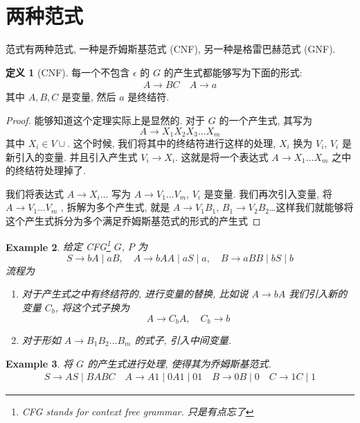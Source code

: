 \documentclass[12pt]{ctexart}
\theoremstyle{definition}
\newtheorem{definition}{定义}[section]
\theoremstyle{plain}
\newtheorem{exam}[definition]{Example}
\theoremstyle{remark}
\begin{document}
\section{两种范式}
\label{sec:两种范式}
范式有两种范式, 一种是乔姆斯基范式 (CNF), 另一种是格雷巴赫范式 (GNF). 

\begin{definition}[CNF]
\label{def:CNF}
每一个不包含 \(\epsilon\) 的 \(G\) 的产生式都能够写为下面的形式: 
\[
	\begin{aligned}
	A  \to BC  \quad A \to a 
	\end{aligned}
\]
其中 \(A,  B , C \) 是变量, 然后 \(a\) 是终结符. 
\end{definition}

\begin{proof}
能够知道这个定理实际上是显然的. 对于 \(G\) 的一个产生式, 其写为 
\[
A \to X_1 X_2 X_3 \dots X_m 
\]
	其中 \(X _{i} \in V \cup\). 这个时候, 我们将其中的终结符进行这样的处理, \(X_{i}\) 换为 \(V_{i}\), \(V_{i}\) 是新引入的变量. 
	并且引入产生式 \(V_{i} \to X _{i}\). 这就是将一个表达式 \(A \to X_1 \dots X_{m}\) 之中的终结符处理掉了. 
	
	我们将表达式 \(A \to X _{i}\dots\) 写为 \(A \to V_1 \dots V_{m}\), \(V_{i}\) 是变量. 我们再次引入变量, 将 \(A \to V_1\dots V_{m}\) , 拆解为多个产生式, 就是 \(A \to V_1 B_1\), \(B_1 \to V_2 B_2\)\dots 这样我们就能够将这个产生式拆分为多个满足乔姆斯基范式的形式的产生式
\end{proof}

\begin{exam}
给定 CFG\footnote{CFG stands for context free grammar. 只是有点忘了} \(G\), \(P\) 为 
\[
S \to b A \mid a B , \quad A \to b A  A \mid a S \mid a, \quad B \to a BB \mid bS \mid b 
\]
流程为
\begin{enumerate}
\item 对于产生式之中有终结符的, 进行变量的替换, 比如说 \(A \to b A\) 我们引入新的变量 \(C_{b}\), 将这个式子换为 
	\[
	A \to C_{b} A , \quad  C_{b} \to b
	\]
\item 对于形如 \(A\to  B_1 B_2 \dots B _{m}\) 的式子, 引入中间变量. 
\end{enumerate}
\end{exam}

\begin{exam}
	将 \(G\) 的产生式进行处理, 使得其为乔姆斯基范式. 
	\[
	\begin{aligned}
	S \to A S \mid B A B C \quad A \to A 1 \mid 0 A 1 \mid 01 \quad B \to 0 B \mid 0 \quad C \to 1 C \mid 1
	\end{aligned}
	\]
\end{exam}
\end{document}
